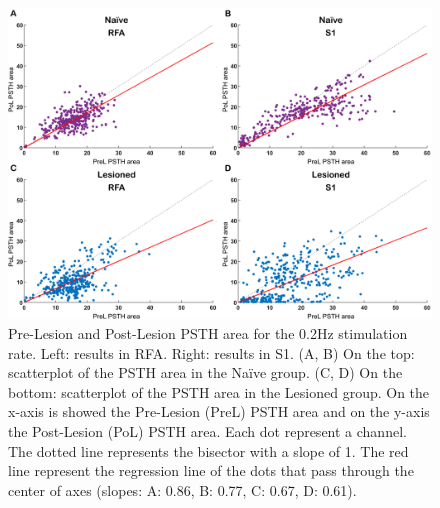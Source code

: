 \begin{figure}[ht!]
    \begin{center}
    \includegraphics[width=\linewidth]{Figure/Lesion Effect/Lesion Effect 0.2Hz.jpg}
    \end{center}
    \caption{Pre-Lesion and Post-Lesion PSTH area for the 0.2Hz stimulation rate. Left: results in RFA. Right: results in S1. (A, B) On the top: scatterplot of the PSTH area in the Naïve group. (C, D) On the bottom: scatterplot of the PSTH area in the Lesioned group. On the x-axis is showed the Pre-Lesion (PreL) PSTH area and on the y-axis the Post-Lesion (PoL) PSTH area. Each dot represent a channel. The dotted line represents the bisector with a slope of 1. The red line represent the regression line of the dots that pass through the center of axes (slopes: A: 0.86, B: 0.77, C: 0.67, D: 0.61).}
    \label{fig:Lesion Effect 0.2Hz}
\end{figure}

